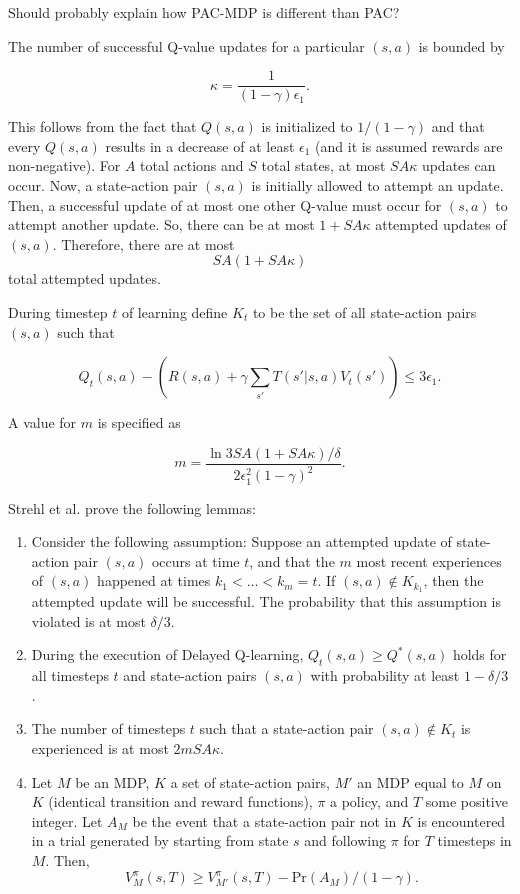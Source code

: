 \documentclass{article} %
\begin{document}
Should probably explain how PAC-MDP is different than PAC?


The number of successful Q-value updates for a particular $(s,a)$ is bounded by

$$\kappa = \frac{1}{(1-\gamma)\epsilon_1}.$$

This follows from the fact that $Q(s,a)$ is initialized to $1/(1-\gamma)$ and that every $Q(s,a)$ results in a decrease of at least $\epsilon_1$ (and it is assumed rewards are non-negative).  For $A$ total actions and $S$ total states, at most $SA\kappa$ updates can occur.  Now, a state-action pair $(s,a)$ is initially allowed to attempt an update.  Then, a successful update of at most one other Q-value must occur  for $(s,a)$ to attempt another update.  So, there can be at most $1+SA\kappa$ attempted updates of $(s,a)$.  Therefore, there are at most
$$SA(1+SA\kappa)$$
total attempted updates.

During timestep $t$ of learning define $K_t$ to be the set of all state-action pairs $(s,a)$ such that 

$$Q_t(s,a) - \left(R(s,a)+\gamma\sum_{s'}T(s'|s,a)V_t(s')\right) \leq 3\epsilon_1.$$

A value for $m$ is specified as 

$$m=\frac{\ln{3SA(1+SA\kappa)/\delta}}{2\epsilon_1^2(1-\gamma)^2}.$$

Strehl et al. prove the following lemmas:

\begin{enumerate}

\item Consider the following assumption:  Suppose an attempted update of state-action pair $(s,a)$ occurs at time $t$, and that the $m$ most recent experiences of $(s,a)$ happened at times $k_1 < \dots < k_m = t$.  If $(s,a) \notin K_{k_1}$, then the attempted update will be successful.  The probability that this assumption is violated is at most $\delta/3$.  


\item During the execution of Delayed Q-learning, $Q_t(s,a) \geq Q^*(s,a)$ holds for all timesteps $t$ and state-action pairs $(s,a)$ with probability at least $1-\delta/3$.

\item The number of timesteps $t$ such that a state-action pair $(s,a) \notin K_t$ is experienced is at most $2mSA\kappa$.

\item Let $M$ be an MDP, $K$ a set of state-action pairs, $M'$ an MDP equal to $M$ on $K$ (identical transition and reward functions), $\pi$ a policy, and
$T$ some positive integer. Let $A_M$ be the event that a state-action pair not in $K$ is encountered in a trial generated by starting from state $s$ and following $\pi$ for $T$ timesteps in $M$. Then,
$$V_M^\pi(s,T)\geq V_{M'}^{\pi}(s,T)-\text{Pr}(A_M)/(1-\gamma).$$

\end{enumerate}
\end{document}
